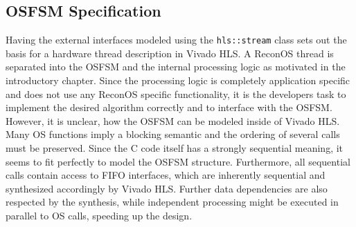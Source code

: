 \subsection{\acs{OSFSM} Specification}
Having the external interfaces modeled using the \lstinline{hls::stream}
class sets out the basis for a hardware thread description in Vivado HLS. A
ReconOS thread is separated into the \ac{OSFSM} and the internal processing
logic as motivated in the introductory chapter. Since the processing logic is
completely application specific and does not use any ReconOS specific
functionality, it is the developers task to implement the desired algorithm
correctly and to interface with the \ac{OSFSM}. However, it is unclear, how
the \ac{OSFSM} can be modeled inside of Vivado HLS. Many \ac{OS} functions
imply a blocking semantic and the ordering of several calls must be preserved.
Since the C code itself has a strongly sequential meaning, it seems to fit
perfectly to model the \ac{OSFSM} structure. Furthermore, all sequential calls
contain access to \ac{FIFO} interfaces, which are inherently sequential and
synthesized accordingly by Vivado HLS. Further data dependencies are also
respected by the synthesis, while independent processing might be executed in
parallel to \ac{OS} calls, speeding up the design.

